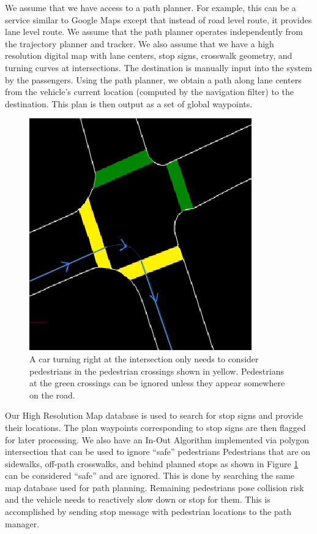 \documentclass[letterpaper, 10 pt, conference]{ieeeconf}  %
\begin{document}
We assume that we have access to a path planner.
For example, this can be a service similar to Google Maps except that instead of road level route, it provides lane level route. 
We assume that the path planner operates independently from the trajectory planner and tracker.
We also assume that we have a high resolution digital map with lane centers, stop signs, crosswalk geometry, and turning curves at intersections.
The destination is manually input into the system by the passengers.
Using the path planner, we obtain a path along lane centers from the vehicle's current location (computed by the navigation filter) to the destination.
This plan is then output as a set of global waypoints.



\begin{figure}[thpb]
  \centering
  \includegraphics[width=0.3\columnwidth]{graphics/IntersectionCrosswalks.png}
  \caption{
    A car turning right at the intersection only needs to consider pedestrians in the pedestrian crossings shown in yellow.
    Pedestrians at the green crossings can be ignored unless they appear somewhere on the road.
  }
  \label{fig:intersect}
\end{figure}

Our High Resolution Map database is used to search for stop signs and provide their locations.
The plan waypoints corresponding to stop signs are then flagged for later processing.
We also have an In-Out Algorithm implemented via polygon intersection that can be used to ignore “safe” pedestrians
Pedestrians that are on sidewalks, off-path crosswalks, and behind planned stops as shown in Figure \ref{fig:intersect} can be considered ``safe'' and are ignored.
This is done by searching the same map database used for path planning.
Remaining pedestrians pose collision risk and the vehicle needs to reactively slow down or stop for them.
This is accomplished by sending stop message with pedestrian locations to the path manager.
\end{document}
